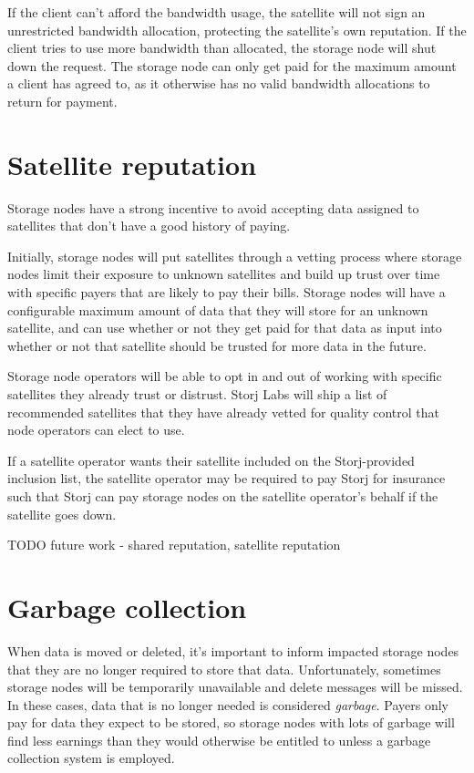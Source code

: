 \documentclass[11pt,fleqn,openany]{book}
\newcommand{\todo}[1]{{\color{red} TODO #1 }}
\begin{document}
If the client can't afford the bandwidth usage, the satellite will not sign an
unrestricted bandwidth allocation, protecting the satellite's own reputation.
If the client tries to use more bandwidth than allocated,
the storage node will shut down the request.
The storage node can only get paid for the maximum amount a client has agreed
to,
as it otherwise has no valid bandwidth allocations to return for
payment.

\section{Satellite reputation}

Storage nodes have a strong incentive to avoid accepting data assigned to
satellites that don't have a good history of paying.

Initially, storage nodes will put satellites through a vetting process
where storage nodes limit their exposure to unknown satellites and build up
trust over time with specific payers that are likely to pay their bills.
Storage nodes
will have a configurable maximum amount of data that they will store for an
unknown satellite, and can use whether or not they get paid for that data
as input into
whether or not that satellite should be trusted for more data in the future.

Storage node operators will be able to opt in and out of working
with specific satellites they already trust or distrust.
Storj Labs will ship a list of recommended satellites that
they have already vetted for quality control that
node operators can elect to use.

If a satellite operator wants their
satellite included on the Storj-provided inclusion list, the satellite operator
may be required to pay Storj for insurance such that Storj can pay storage
nodes on the satellite operator's behalf if the satellite goes down.

\todo{future work - shared reputation, satellite reputation}

\section{Garbage collection}

When data is moved or deleted, it's important to inform impacted storage nodes
that they are no longer required to store that data. Unfortunately, sometimes
storage nodes will be temporarily unavailable and delete messages will be
missed. In these cases, data that is no longer needed is considered
{\em garbage}. Payers only pay for data they expect to be stored, so storage
nodes with lots of garbage will find less earnings than they would
otherwise be entitled to unless a garbage collection system is employed.
\end{document}
